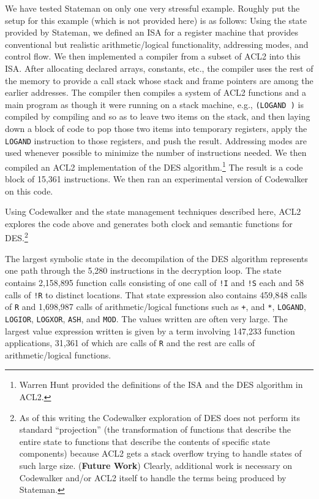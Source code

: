\documentclass[submission,copyright,creativecommons]{eptcs}
\newcommand{\ptt}[1]{\tt{#1}}
\begin{document}
We have tested Stateman on only one very stressful example.  Roughly put the
setup for this example (which is not provided here) is as follows: Using the
state provided by Stateman, we defined an ISA for a register machine that
provides conventional but realistic arithmetic/logical functionality,
addressing modes, and control flow.  We then implemented a compiler from a
subset of ACL2 into this ISA.  After allocating declared arrays, constants,
etc., the compiler uses the rest of the memory to provide a call stack whose
stack and frame pointers are among the earlier addresses.  The compiler then
compiles a system of ACL2 functions and a main program as though it were
running on a stack machine, e.g., {\ptt{(LOGAND  )}} is compiled by compiling
 and  so as to leave two items on the stack, and then laying down a
block of code to pop those two items into temporary registers, apply the
{\ptt{LOGAND}} instruction to those registers, and push the result.
Addressing modes are used whenever possible to minimize the number of
instructions needed.  We then compiled an ACL2 implementation of the DES
algorithm.\footnote{Warren Hunt provided the definitions of the ISA and the
  DES algorithm in ACL2.}  The result is a code block of 15,361 instructions.
We then ran an experimental version of Codewalker on this code.

Using Codewalker and the state management techniques described here, ACL2
explores the code above and generates both clock and semantic functions for
DES.\footnote{As of this writing the Codewalker exploration of DES does not
  perform its standard ``projection'' (the transformation of functions that
  describe the entire state to functions that describe the contents of
  specific state components) because ACL2 gets a stack overflow trying to
  handle states of such large size.  ({\bf{Future Work}}) Clearly, additional
  work is necessary on Codewalker and/or ACL2 itself to handle the terms
  being produced by Stateman.}

The largest symbolic state in the decompilation of the DES algorithm
represents one path through the 5,280 instructions in the decryption loop.
The state contains 2,158,895 function calls consisting of one call of
{\ptt{!I}} and {\ptt{!S}} each and 58 calls of {\ptt{!R}} to distinct
locations.  That state expression also contains 459,848 calls of {\ptt{R}}
and 1,698,987 calls of arithmetic/logical functions such as {\ptt{+}}, and
{\ptt{*}}, {\ptt{LOGAND}}, {\ptt{LOGIOR}}, {\ptt{LOGXOR}}, {\ptt{ASH}}, and
{\ptt{MOD}}.  The values written are often very large.  The largest value
expression written is given by a term involving 147,233 function
applications, 31,361 of which are calls of {\ptt{R}} and the rest are calls
of arithmetic/logical functions.
\end{document}
